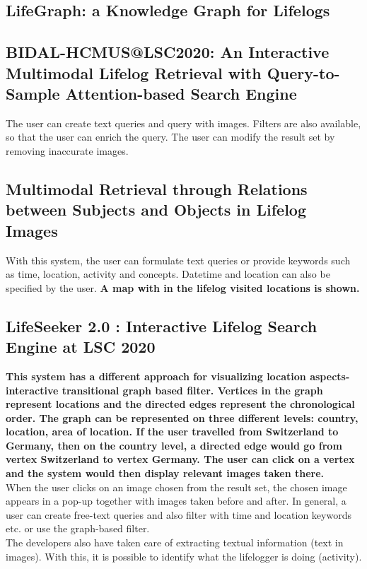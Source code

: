 \subsection{LifeGraph: a Knowledge Graph for Lifelogs}

\subsection{BIDAL-HCMUS@LSC2020: An Interactive Multimodal Lifelog Retrieval with Query-to-Sample Attention-based Search Engine}
The user can create text queries and query with images. Filters are also available, so that the user can enrich the query. The user can modify the result set by removing inaccurate images.

\subsection{Multimodal Retrieval through Relations between Subjects and Objects in Lifelog Images}
With this system, the user can formulate text queries or provide keywords such as time, location, activity and concepts.
Datetime and location can also be specified by the user. \textbf{A map with in the lifelog visited locations is shown.}

\subsection{LifeSeeker 2.0 : Interactive Lifelog Search Engine at LSC 2020}
\textbf{This system has a different approach for visualizing location aspects-interactive transitional graph based filter. Vertices in the graph represent locations and the directed edges represent the chronological order. The graph can be represented on three different levels: country, location, area of location. If the user travelled from Switzerland to Germany, then on the country level, a directed edge would go from vertex Switzerland to vertex Germany. The user can click on a vertex and the system would then display relevant images taken there.}\\

When the user clicks on an image chosen from the result set, the chosen image appears in a pop-up together with images taken before and after.
In general, a user can create free-text queries and also filter with time and location keywords etc. or use the graph-based filter.\\

The developers also have taken care of extracting textual information (text in images). With this, it is possible to identify what the lifelogger is doing (activity).

